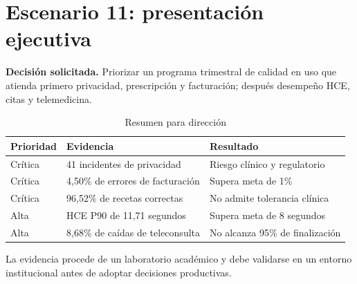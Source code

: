 \chapter{Escenario 11: presentación ejecutiva}

\textbf{Decisión solicitada.} Priorizar un programa trimestral de calidad en uso que atienda primero privacidad, prescripción y facturación; después desempeño HCE, citas y telemedicina.

\begin{table}[H]\centering
\caption{Resumen para dirección}
\begin{tabularx}{\textwidth}{lXl}\toprule
Prioridad & Evidencia & Resultado\\\midrule
Crítica & 41 incidentes de privacidad & Riesgo clínico y regulatorio\\
Crítica & 4,50\% de errores de facturación & Supera meta de 1\%\\
Crítica & 96,52\% de recetas correctas & No admite tolerancia clínica\\
Alta & HCE P90 de 11,71 segundos & Supera meta de 8 segundos\\
Alta & 8,68\% de caídas de teleconsulta & No alcanza 95\% de finalización\\\bottomrule
\end{tabularx}
\end{table}

La evidencia procede de un laboratorio académico y debe validarse en un entorno institucional antes de adoptar decisiones productivas.

